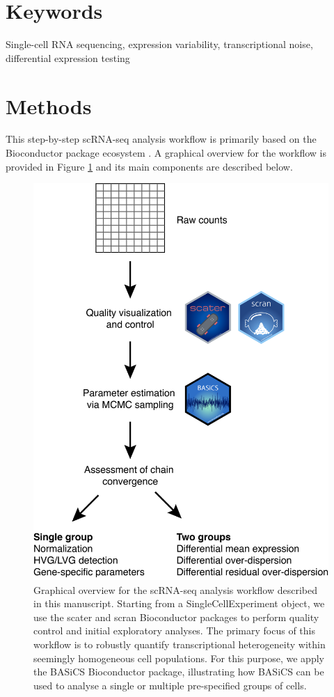 \documentclass[9pt,a4paper,]{extarticle}
\begin{document}
\section*{Keywords}
Single-cell RNA sequencing, expression variability, transcriptional noise, differential expression testing


\clearpage
\pagestyle{main}

\hypertarget{methods}{%
\section{Methods}\label{methods}}

This step-by-step scRNA-seq analysis workflow is primarily based on the
Bioconductor package ecosystem \citep{Amezquita2019}.
A graphical overview for the workflow is provided in Figure \ref{fig:overview}
and its main components are described below.

\begin{figure}[h]

{\centering \includegraphics[width=0.5\linewidth]{figure/Overview} 

}

\caption{Graphical overview for the scRNA-seq analysis workflow described in this manuscript. Starting from a SingleCellExperiment object, we use the scater and scran Bioconductor packages to perform quality control and initial exploratory analyses. The primary focus of this workflow is to robustly quantify transcriptional heterogeneity within seemingly homogeneous cell populations. For this purpose, we apply the BASiCS Bioconductor package, illustrating how BASiCS can be used to analyse a single or multiple pre-specified groups of cells.}\label{fig:overview}
\end{figure}
\end{document}
